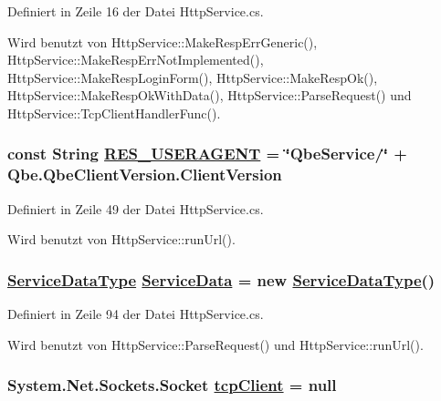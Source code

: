 Definiert in Zeile 16 der Datei Http\-Service.cs.

Wird benutzt von Http\-Service::Make\-Resp\-Err\-Generic(), Http\-Service::Make\-Resp\-Err\-Not\-Implemented(), Http\-Service::Make\-Resp\-Login\-Form(), Http\-Service::Make\-Resp\-Ok(), Http\-Service::Make\-Resp\-Ok\-With\-Data(), Http\-Service::Parse\-Request() und Http\-Service::Tcp\-Client\-Handler\-Func().\hypertarget{classQbeSAS_1_1HttpService_QbeSAS_1_1HttpServicer14}{
\subsubsection[RES\_\-USERAGENT]{\setlength{\rightskip}{0pt plus 5cm}const String \hyperlink{classQbeSAS_1_1HttpService_QbeSAS_1_1HttpServicer14}{RES\_\-USERAGENT} = \char`\"{}Qbe\-Service/\char`\"{} + Qbe.Qbe\-Client\-Version.Client\-Version}}
\label{classQbeSAS_1_1HttpService_QbeSAS_1_1HttpServicer14}




Definiert in Zeile 49 der Datei Http\-Service.cs.

Wird benutzt von Http\-Service::run\-Url().\hypertarget{classQbeSAS_1_1HttpService_QbeSAS_1_1HttpServicer15}{
\subsubsection[ServiceData]{\setlength{\rightskip}{0pt plus 5cm}\hyperlink{classQbeSAS_1_1HttpService_1_1ServiceDataType}{Service\-Data\-Type} \hyperlink{classQbeSAS_1_1HttpService_QbeSAS_1_1HttpServicer15}{Service\-Data} = new \hyperlink{classQbeSAS_1_1HttpService_1_1ServiceDataType}{Service\-Data\-Type}()}}
\label{classQbeSAS_1_1HttpService_QbeSAS_1_1HttpServicer15}




Definiert in Zeile 94 der Datei Http\-Service.cs.

Wird benutzt von Http\-Service::Parse\-Request() und Http\-Service::run\-Url().\hypertarget{classQbeSAS_1_1HttpService_QbeSAS_1_1HttpServicer17}{
\subsubsection[tcpClient]{\setlength{\rightskip}{0pt plus 5cm}System.Net.Sockets.Socket \hyperlink{classQbeSAS_1_1HttpService_QbeSAS_1_1HttpServicer17}{tcp\-Client} = null}}
\label{classQbeSAS_1_1HttpService_QbeSAS_1_1HttpServicer17}




